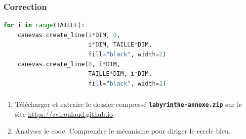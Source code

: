 \documentclass[svgnames,11pt]{beamer}
\begin{document}
\begin{frame}[fragile]
    \frametitle{Correction}

\begin{center}
\begin{lstlisting}[language=Python , basicstyle=\ttfamily\small, xleftmargin=0.2em, xrightmargin=0em]
for i in range(TAILLE):
    canevas.create_line(i*DIM, 0, 
                        i*DIM, TAILLE*DIM, 
                        fill="black", width=2)
    canevas.create_line(0, i*DIM, 
                        TAILLE*DIM, i*DIM,  
                        fill="black", width=2)
\end{lstlisting}
\end{center} 
\end{frame}
\begin{frame}
    \frametitle{}
\begin{activite}
\begin{enumerate}
    \item Télécharger et extraire le dossier compressé \textbf{\texttt{labyrinthe-annexe.zip}} sur le site \url{https://cviroulaud.github.io}
    \item Analyser le code. Comprendre le mécanisme pour diriger le cercle bleu.
\end{enumerate}
\end{activite}
\end{frame}
\end{document}
